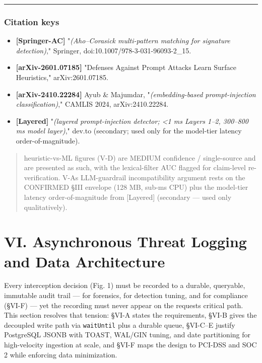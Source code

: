 \begin{center}\rule{0.5\linewidth}{0.5pt}\end{center}

\subsubsection{Citation keys}\label{citation-keys-3}

\begin{itemize}
\tightlist
\item
  \textbf{{[}Springer-AC{]}} "\emph{(Aho--Corasick multi-pattern
  matching for signature detection)}," Springer,
  doi:10.1007/978-3-031-96093-2\_15.
\item
  \textbf{{[}arXiv-2601.07185{]}} "Defenses Against Prompt Attacks Learn
  Surface Heuristics," arXiv:2601.07185.
\item
  \textbf{{[}arXiv-2410.22284{]}} Ayub \& Majumdar,
  "\emph{(embedding-based prompt-injection classification)}," CAMLIS
  2024, arXiv:2410.22284.
\item
  \textbf{{[}Layered{]}} "\emph{(layered prompt-injection detector;
  \textless1 ms Layers 1--2, 300--800 ms model layer)}," dev.to
  (secondary; used only for the model-tier latency order-of-magnitude).
\end{itemize}

\begin{quote}
heuristic-vs-ML figures (V-D) are MEDIUM confidence / single-source and
are presented as such, with the lexical-filter AUC flagged for
claim-level re-verification. V-A\textquotesingle s LLM-guardrail
incompatibility argument rests on the CONFIRMED §III envelope (128 MB,
sub-ms CPU) plus the model-tier latency order-of-magnitude from
{[}Layered{]} (secondary --- used only qualitatively).
\end{quote}

\section{VI. Asynchronous Threat Logging and Data
Architecture}\label{vi-asynchronous-threat-logging-and-data-architecture}

Every interception decision (Fig. 1) must be recorded to a durable,
queryable, immutable audit trail --- for forensics, for detection
tuning, and for compliance (§VI-F) --- yet the recording must never
appear on the request\textquotesingle s critical path. This section
resolves that tension: §VI-A states the requirements, §VI-B gives the
decoupled write path via \passthrough{\lstinline!waitUntil!} plus a
durable queue, §VI-C--E justify PostgreSQL JSONB with TOAST, WAL/GIN
tuning, and date partitioning for high-velocity ingestion at scale, and
§VI-F maps the design to PCI-DSS and SOC 2 while enforcing data
minimization.

